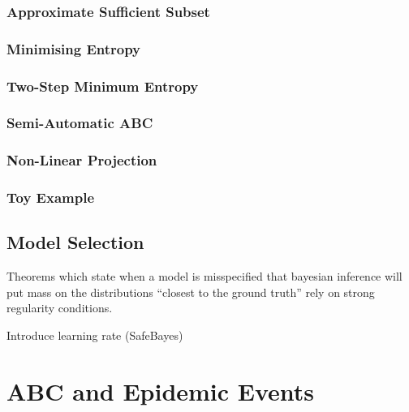 \documentclass[11pt,a4paper,margin=0]{article}
\theoremstyle{break}
\begin{document}
\subsubsection*{Approximate Sufficient Subset \cite[]{Approximately_sufficient_statistics_and_bayesian_computation}}
\subsubsection*{Minimising Entropy \cite[]{on_optimal_selection_of_summary_stats_for_ABC}}
\subsubsection*{Two-Step Minimum Entropy \cite[]{on_optimal_selection_of_summary_stats_for_ABC}}
\subsubsection*{Semi-Automatic ABC \cite[]{constructing_summary_statistics_for_approximate_bayesian_computation_semi_automatic_ABC}}
\subsubsection*{Non-Linear Projection}
\subsubsection*{Toy Example}

\subsection{Model Selection}

  \par Theorems which state when a model is misspecified that bayesian inference will put mass on the distributions ``closest to the ground truth'' rely on strong regularity conditions. \cite[]{inconsistency_of_bayesian_inference_for_misspecified_linear_models_and_a_proposal_for_reparing_it}
  \par Introduce learning rate (SafeBayes) \cite[]{inconsistency_of_bayesian_inference_for_misspecified_linear_models_and_a_proposal_for_reparing_it}

\newpage
\section{ABC and Epidemic Events}\label{sec_epidemic_events}

\newpage


\end{document}
